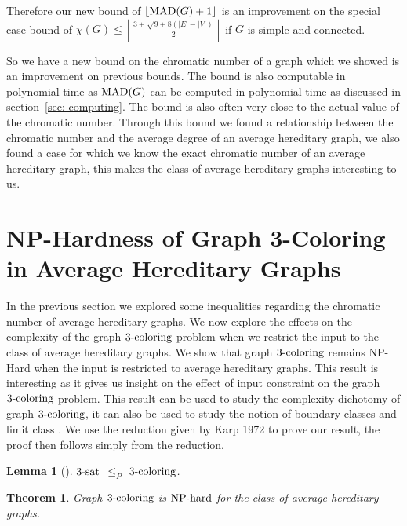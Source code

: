 \documentclass{article}
\newcommand{\classX}[1]{\ensuremath{\text{\textsf{\textbf{#1}}}}}
\newcommand{\NPH}{\classX{NP-hard}}
\newcommand{\MAD}{\ensuremath{\text{\textit{MAD}}}}
\newcommand{\Prob}[1]{\ensuremath{\text{\textsc{#1}}}}
\newtheorem{theorem}{Theorem}
\newtheorem{lemma}{Lemma}
\begin{document}
Therefore our new bound of $\lfloor \MAD(G)+1 \rfloor$ is an improvement on the special case bound of $\chi(G) \leq \left\lfloor \frac{3+\sqrt{9+8(|E|-|V|)}}{2} \right\rfloor$ if $G$ is simple and connected. 

So we have a new bound on the chromatic number of a graph which we showed is an improvement on previous bounds. The bound is also computable in polynomial time as $\MAD(G)$ can be computed in polynomial time as discussed in section~\ref*{sec: computing}. The bound is also often very close to the actual value of the chromatic number.
Through this bound we found a relationship between the chromatic number and the average degree of an average hereditary graph, we also found a case for which we know the exact chromatic number of an average hereditary graph, this makes the class of average hereditary graphs interesting to us.



\section{NP-Hardness of Graph 3-Coloring in Average Hereditary Graphs}\label{sec: hardness}
In the previous section we explored some inequalities regarding the chromatic number of average hereditary graphs. We now explore the effects on the complexity of the graph \Prob{3-coloring} problem when we restrict the input to the class of average hereditary graphs. We show that graph \Prob{3-coloring} remains NP-Hard when the input is restricted to average hereditary graphs. This result is interesting as it gives us insight on the effect of input constraint on the graph \Prob{3-coloring} problem. This result can be used to study the complexity dichotomy of graph \Prob{3-coloring}, it can also be used to study the notion of boundary classes and limit class \cite{10,9}. We use the reduction given by Karp 1972 \cite{6} to prove our result, the proof then follows simply from the reduction.

\begin{lemma}[\cite{6}]
    \Prob{3-sat} $\leq_P$ \Prob{3-coloring}.
\end{lemma}

\begin{theorem}\label{nphardclass}
    Graph \Prob{3-coloring} is $\NPH$ for the class of average hereditary graphs.
\end{theorem}
\end{document}
